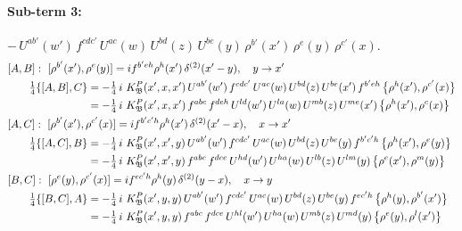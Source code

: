 \documentclass[10pt]{article}
\numberwithin{equation}{section}
\begin{document}
\paragraph{Sub-term 3:} $-\,U^{ab'}(w')\,f^{cdc'}\,U^{ac}(w)\,U^{bd}(z)\,U^{be}(y)\,\rho^{b'}(x')\,\rho^{e}(y)\,\rho^{c'}(x)$.
\begin{align}
&[A,B]:\ [\rho^{b'}(x'),\rho^{e}(y)]=i f^{b'eh}\rho^{h}(x')\,\delta^{(2)}(x'-y),\quad y\to x'\notag\\
&\qquad \tfrac14\{[A,B],C\}=-\tfrac14\,i\,\,K^{P}_{\mathfrak B}(x',x,x')\,U^{ab'}(w')\,f^{cdc'}\,U^{ac}(w)\,U^{bd}(z)\,U^{be}(x')\,f^{b'eh}\,\big\{\rho^{h}(x'),\rho^{c'}(x)\big\}\notag\\
&\qquad\phantom{\tfrac14\{[A,B],C\}}=-\tfrac14\,i\,\,K^{P}_{\mathfrak B}(x',x,x')\,f^{abc}\,f^{deh}\,U^{ld}(w')\,U^{la}(w)\,U^{mb}(z)\,U^{me}(x')\,\big\{\rho^{h}(x'),\rho^{c}(x)\big\}
\label{eq:GI.IV.P-3-AB}\\
&[A,C]:\ [\rho^{b'}(x'),\rho^{c'}(x)]=i f^{b'c'h}\rho^{h}(x')\,\delta^{(2)}(x'-x),\quad x\to x'\notag\\
&\qquad \tfrac14\{[A,C],B\}=-\tfrac14\,i\,\,K^{P}_{\mathfrak B}(x',x',y)\,U^{ab'}(w')\,f^{cdc'}\,U^{ac}(w)\,U^{bd}(z)\,U^{be}(y)\,f^{b'c'h}\,\big\{\rho^{h}(x'),\rho^{e}(y)\big\}\notag\\
&\qquad\phantom{\tfrac14\{[A,C],B\}}=-\tfrac14\,i\,\,K^{P}_{\mathfrak B}(x',x',y)\,f^{abc}\,f^{dce}\,U^{hd}(w')\,U^{ha}(w)\,U^{lb}(z)\,U^{lm}(y)\,\big\{\rho^{e}(x'),\rho^{m}(y)\big\}
\label{eq:GI.IV.P-3-AC}\\
&[B,C]:\ [\rho^{e}(y),\rho^{c'}(x)]=i f^{ec'h}\rho^{h}(y)\,\delta^{(2)}(y-x),\quad x\to y\notag\\
&\qquad \tfrac14\{[B,C],A\}=-\tfrac14\,i\,\,K^{P}_{\mathfrak B}(x',y,y)\,U^{ab'}(w')\,f^{cdc'}\,U^{ac}(w)\,U^{bd}(z)\,U^{be}(y)\,f^{ec'h}\,\big\{\rho^{h}(y),\rho^{b'}(x')\big\}\notag\\
&\qquad\phantom{\tfrac14\{[B,C],A\}}=-\tfrac14\,i\,\,K^{P}_{\mathfrak B}(x',y,y)\,f^{abc}\,f^{dce}\,U^{hl}(w')\,U^{ha}(w)\,U^{mb}(z)\,U^{md}(y)\,\big\{\rho^{e}(y),\rho^{l}(x')\big\}
\label{eq:GI.IV.P-3-BC}
\end{align}
\end{document}
